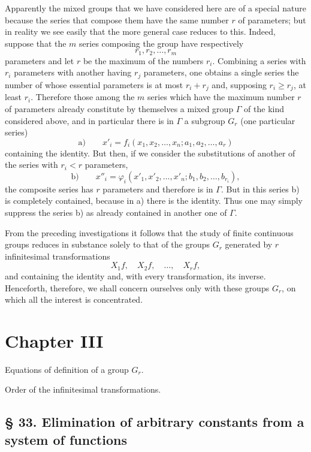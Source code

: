 \documentclass[11pt]{book}
\begin{document}
Apparently the mixed groups that we have considered here are of a special nature because the series that compose them have the same number $r$ of parameters; but in reality we see easily that the more general case reduces to this. Indeed, suppose that the $m$ series composing the group have respectively
\[
 r_1,r_2,\ldots,r_m
\]
parameters and let $r$ be the maximum of the numbers $r_i$. Combining a series with $r_i$ parameters with another having $r_j$ parameters, one obtains a single series the number of whose essential parameters is at most $r_i+r_j$ and, supposing $r_i\ge r_j$, at least $r_i$. Therefore those among the $m$ series which have the maximum number $r$ of parameters already constitute by themselves a mixed group $\Gamma$ of the kind considered above, and in particular there is in $\Gamma$ a subgroup $G_r$ (one particular series)
\[
 \text{a)}\qquad x'_i=f_i(x_1,x_2,\ldots,x_n; a_1,a_2,\ldots,a_r)
\]
containing the identity. But then, if we consider the substitutions of another of the series with $r_i<r$ parameters,
\[
 \text{b)}\qquad x''_i=\varphi_i(x'_1,x'_2,\ldots,x'_n; b_1,b_2,\ldots,b_{r_i}),
\]
the composite series has $r$ parameters and therefore is in $\Gamma$. But in this series b) is completely contained, because in a) there is the identity. Thus one may simply suppress the series b) as already contained in another one of $\Gamma$.

From the preceding investigations it follows that the study of finite continuous groups reduces in substance solely to that of the groups $G_r$ generated by $r$ infinitesimal transformations
\[
 X_1f,
 \quad X_2f,
 \quad \ldots,
 \quad X_rf,
\]
and containing the identity and, with every transformation, its inverse. Henceforth, therefore, we shall concern ourselves only with these groups $G_r$, on which all the interest is concentrated.

\chapter*{Chapter III}

\begin{center}
\begin{minipage}{0.88\linewidth}
\centering
Equations of definition of a group $G_r$.\par
Order of the infinitesimal transformations.
\end{minipage}
\end{center}

\section*{\S{} 33. Elimination of arbitrary constants from a system of functions}
\end{document}
